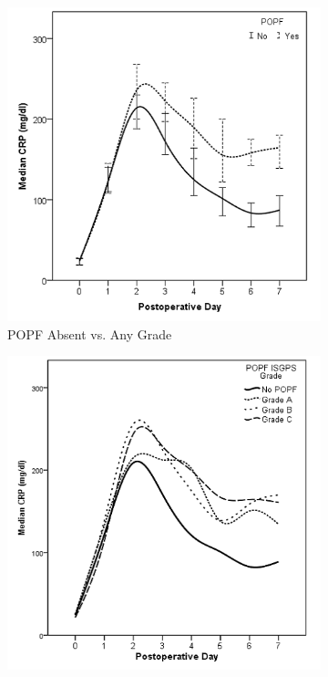 \clearpage
\begin{figure}[t]
	\caption{Serum CRP levels in the first week after pancreaticoduodenectomy in patients with postoperative pancreatic fistula (POPF).}
	\label{fig:crp_comp_crp_popf}
	\centering
	\begin{subfigure}{0.48\textwidth}
		\centering
		\includegraphics[width=\textwidth]{Figures/crp_comp_crp_popf_yes_no}
		\caption{POPF Absent vs. Any Grade}
		\label{fig:crp_comp_crp_popf_yes_no}
	\end{subfigure}
	\hfill
	\begin{subfigure}{0.48\textwidth}
		\centering
		\includegraphics[width=\textwidth]{Figures/crp_comp_crp_popf_isgps}

\end{subfigure}
\end{figure}

